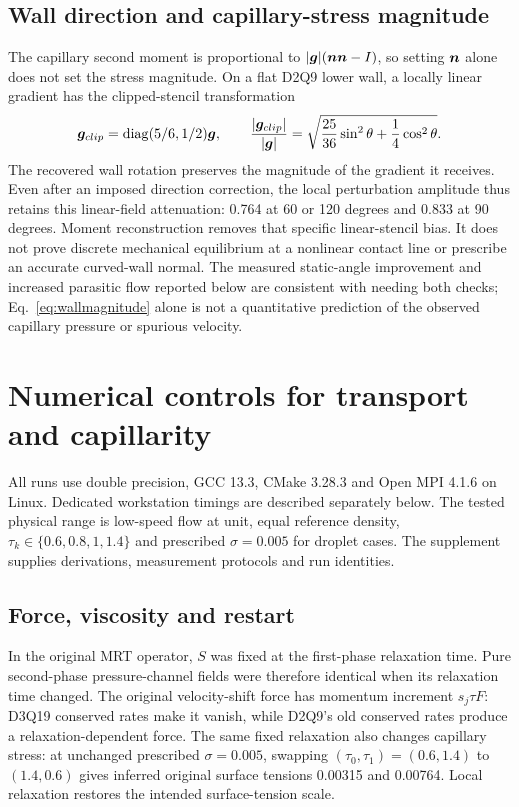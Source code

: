 \subsection{Wall direction and capillary-stress magnitude}
The capillary second moment is proportional to
$|\bm{g}|(\bm{n}\bm{n}-I)$, so setting $\bm{n}$ alone does not set the stress
magnitude. On a flat D2Q9 lower wall, a locally linear gradient has the
clipped-stencil transformation
\begin{equation}
 \bm{g}_{clip}=\operatorname{diag}(5/6,1/2)\bm{g},\qquad
 \frac{|\bm{g}_{clip}|}{|\bm{g}|}
 =\sqrt{\frac{25}{36}\sin^2\theta+\frac14\cos^2\theta}.
 \label{eq:wallmagnitude}
\end{equation}
The recovered wall rotation preserves the magnitude of the gradient it
receives. Even after an imposed direction correction, the local perturbation
amplitude thus retains this linear-field attenuation: 0.764 at 60 or 120
degrees and 0.833 at 90 degrees. Moment reconstruction removes that specific
linear-stencil bias. It does not prove discrete mechanical equilibrium at a
nonlinear contact line or prescribe an accurate curved-wall normal. The
measured static-angle improvement and increased parasitic flow reported
below are consistent with needing both checks; Eq.~\ref{eq:wallmagnitude}
alone is not a quantitative prediction of the observed capillary pressure
or spurious velocity.

\section{Numerical controls for transport and capillarity}
All runs use double precision, GCC 13.3, CMake 3.28.3 and Open MPI 4.1.6 on
Linux. Dedicated workstation timings are described separately below.
The tested physical range is low-speed flow at unit, equal reference density,
$\tau_k\in\{0.6,0.8,1,1.4\}$ and prescribed $\sigma=0.005$ for droplet cases.
The supplement supplies derivations, measurement protocols and run identities.

\subsection{Force, viscosity and restart}
In the original MRT operator, $S$ was fixed at the first-phase relaxation
time. Pure second-phase pressure-channel fields were therefore identical
when its relaxation time changed. The original velocity-shift force has
momentum increment $s_j\tau F$: D3Q19 conserved rates make it vanish, while
D2Q9's old conserved rates produce a relaxation-dependent force.
The same fixed relaxation also changes capillary stress: at unchanged
prescribed $\sigma=0.005$, swapping $(\tau_0,\tau_1)=(0.6,1.4)$ to
$(1.4,0.6)$ gives inferred original surface tensions 0.00315 and 0.00764.
Local relaxation restores the intended surface-tension scale.

